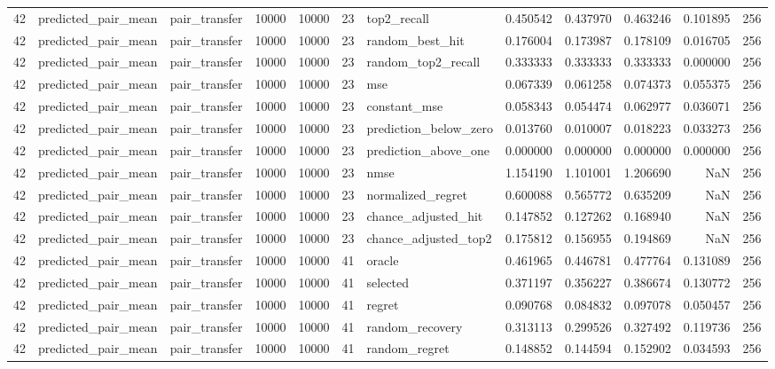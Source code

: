 \begin{tabular}{rllrrrlrrrrr}
42 & predicted_pair_mean & pair_transfer & 10000 & 10000 & 23 & top2_recall & 0.450542 & 0.437970 & 0.463246 & 0.101895 & 256 \\
42 & predicted_pair_mean & pair_transfer & 10000 & 10000 & 23 & random_best_hit & 0.176004 & 0.173987 & 0.178109 & 0.016705 & 256 \\
42 & predicted_pair_mean & pair_transfer & 10000 & 10000 & 23 & random_top2_recall & 0.333333 & 0.333333 & 0.333333 & 0.000000 & 256 \\
42 & predicted_pair_mean & pair_transfer & 10000 & 10000 & 23 & mse & 0.067339 & 0.061258 & 0.074373 & 0.055375 & 256 \\
42 & predicted_pair_mean & pair_transfer & 10000 & 10000 & 23 & constant_mse & 0.058343 & 0.054474 & 0.062977 & 0.036071 & 256 \\
42 & predicted_pair_mean & pair_transfer & 10000 & 10000 & 23 & prediction_below_zero & 0.013760 & 0.010007 & 0.018223 & 0.033273 & 256 \\
42 & predicted_pair_mean & pair_transfer & 10000 & 10000 & 23 & prediction_above_one & 0.000000 & 0.000000 & 0.000000 & 0.000000 & 256 \\
42 & predicted_pair_mean & pair_transfer & 10000 & 10000 & 23 & nmse & 1.154190 & 1.101001 & 1.206690 & NaN & 256 \\
42 & predicted_pair_mean & pair_transfer & 10000 & 10000 & 23 & normalized_regret & 0.600088 & 0.565772 & 0.635209 & NaN & 256 \\
42 & predicted_pair_mean & pair_transfer & 10000 & 10000 & 23 & chance_adjusted_hit & 0.147852 & 0.127262 & 0.168940 & NaN & 256 \\
42 & predicted_pair_mean & pair_transfer & 10000 & 10000 & 23 & chance_adjusted_top2 & 0.175812 & 0.156955 & 0.194869 & NaN & 256 \\
42 & predicted_pair_mean & pair_transfer & 10000 & 10000 & 41 & oracle & 0.461965 & 0.446781 & 0.477764 & 0.131089 & 256 \\
42 & predicted_pair_mean & pair_transfer & 10000 & 10000 & 41 & selected & 0.371197 & 0.356227 & 0.386674 & 0.130772 & 256 \\
42 & predicted_pair_mean & pair_transfer & 10000 & 10000 & 41 & regret & 0.090768 & 0.084832 & 0.097078 & 0.050457 & 256 \\
42 & predicted_pair_mean & pair_transfer & 10000 & 10000 & 41 & random_recovery & 0.313113 & 0.299526 & 0.327492 & 0.119736 & 256 \\
42 & predicted_pair_mean & pair_transfer & 10000 & 10000 & 41 & random_regret & 0.148852 & 0.144594 & 0.152902 & 0.034593 & 256 \\

\end{tabular}
